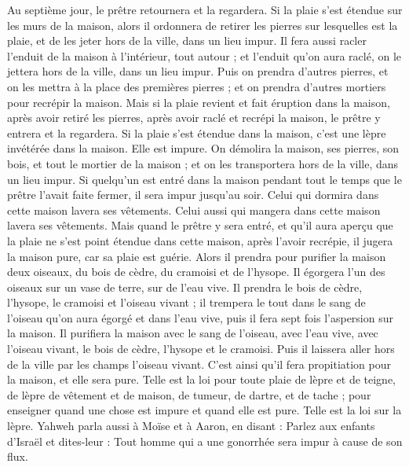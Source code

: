 \begin{multicols}{2}
Au septième jour, le prêtre retournera et la regardera. Si la plaie s'est étendue sur les murs de la maison,
alors il ordonnera de retirer les pierres sur lesquelles est la plaie, et de les jeter hors de la ville, dans un lieu impur.
Il fera aussi racler l'enduit de la maison à l'intérieur, tout autour ; et l'enduit qu'on aura raclé, on le jettera hors de la ville, dans un lieu impur.
Puis on prendra d'autres pierres, et on les mettra à la place des premières pierres ; et on prendra d'autres mortiers pour recrépir la maison.
Mais si la plaie revient et fait éruption dans la maison, après avoir retiré les pierres, après avoir raclé et recrépi la maison,
le prêtre y entrera et la regardera. Si la plaie s'est étendue dans la maison, c'est une lèpre invétérée dans la maison. Elle est impure.
On démolira la maison, ses pierres, son bois, et tout le mortier de la maison ; et on les transportera hors de la ville, dans un lieu impur.
Si quelqu'un est entré dans la maison pendant tout le temps que le prêtre l'avait faite fermer, il sera impur jusqu'au soir.
Celui qui dormira dans cette maison lavera ses vêtements. Celui aussi qui mangera dans cette maison lavera ses vêtements.
Mais quand le prêtre y sera entré, et qu'il aura aperçu que la plaie ne s'est point étendue dans cette maison, après l'avoir recrépie, il jugera la maison pure, car sa plaie est guérie.
Alors il prendra pour purifier la maison deux oiseaux, du bois de cèdre, du cramoisi et de l'hysope.
Il égorgera l'un des oiseaux sur un vase de terre, sur de l'eau vive.
Il prendra le bois de cèdre, l'hysope, le cramoisi et l'oiseau vivant ; il trempera le tout dans le sang de l'oiseau qu'on aura égorgé et dans l'eau vive, puis il fera sept fois l'aspersion sur la maison.
Il purifiera la maison avec le sang de l'oiseau, avec l'eau vive, avec l'oiseau vivant, le bois de cèdre, l'hysope et le cramoisi.
Puis il laissera aller hors de la ville par les champs l'oiseau vivant. C'est ainsi qu'il fera propitiation pour la maison, et elle sera pure.
Telle est la loi pour toute plaie de lèpre et de teigne,
de lèpre de vêtement et de maison,
de tumeur, de dartre, et de tache ;
pour enseigner quand une chose est impure et quand elle est pure. Telle est la loi sur la lèpre.
\VerseOne{}Yahweh parla aussi à Moïse et à Aaron, en disant :
Parlez aux enfants d'Israël et dites-leur : Tout homme qui a une gonorrhée sera impur à cause de son flux.

\end{multicols}
